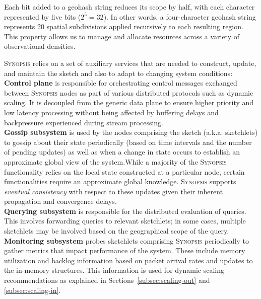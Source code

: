 Each bit added to a geohash string reduces its scope by half, with each character represented by five bits ($2^5 = 32$). In other words, a four-character geohash string represents 20 spatial subdivisions applied recursively to each resulting region. This property allows us to manage and allocate resources across a variety of observational densities.

\textsc{Synopsis} relies on a set of auxiliary services that are needed to construct, update, and maintain the sketch and also to adapt to changing system conditions:
\vspace{0.5em} \\
	\textbf{Control plane} is responsible for orchestrating control messages exchanged between \textsc{Synopsis} nodes as part of various distributed protocols such as dynamic scaling.
    It is decoupled from the generic data plane to ensure higher priority and low latency processing without being affected by buffering delays and backpressure experienced during stream processing.
\vspace{0.4em} \\
	\textbf{Gossip subsystem} is used by the nodes comprising the sketch (a.k.a. sketchlets) to gossip about their state periodically (based on time intervals and the number of pending updates) as well as when a change in state occurs to establish an approximate global view of the system.While a majority of the \textsc{Synopsis} functionality relies on the local state constructed at a particular node, certain functionalities require an approximate global knowledge. 
    \textsc{Synopsis} supports \emph{eventual consistency} with respect to these updates given their inherent propagation and convergence delays.
\vspace{0.4em} \\
	\textbf{Querying subsystem} is responsible for the distributed evaluation of queries.
    This involves forwarding queries to relevant sketchlets; in some cases, multiple sketchlets may be involved based on the geographical scope of the query.
\vspace{0.8em} \\
    \textbf{Monitoring subsystem} probes sketchlets comprising \textsc{Synopsis} periodically to gather metrics that impact performance of the system.
    These include memory utilization and backlog information based on packet arrival rates and updates to the in-memory structures.
    This information is used for dynamic scaling recommendations as explained in Sections~\ref{subsec:scaling-out} and \ref{subsec:scaling-in}.
